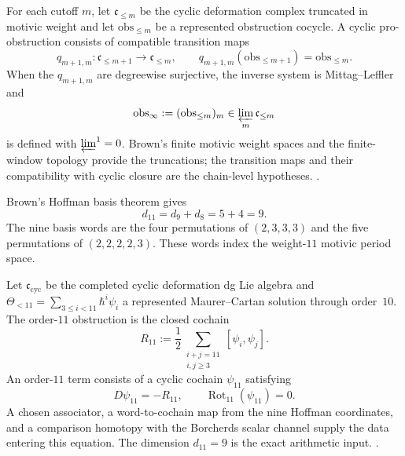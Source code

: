 \begin{remark}
\label{rem:nc-obs-infty}
For each cutoff \(m\), let \(\mathfrak c_{\leq m}\) be the cyclic
deformation complex truncated in motivic weight and let
\(\mathrm{obs}_{\leq m}\) be a represented obstruction cocycle.
A cyclic pro-obstruction consists of compatible transition maps
\[
 q_{m+1,m}\colon\mathfrak c_{\leq m+1}\longrightarrow
 \mathfrak c_{\leq m},
 \qquad
 q_{m+1,m}(\mathrm{obs}_{\leq m+1})
 =
 \mathrm{obs}_{\leq m}.
\]
When the \(q_{m+1,m}\) are degreewise surjective, the inverse system is
Mittag--Leffler and
\[
 \mathrm{obs}_\infty:=
 (\mathrm{obs}_{\leq m})_m
 \in\varprojlim_m\mathfrak c_{\leq m}
\]
is defined with \(\varprojlim^1=0\).  Brown's finite motivic
weight spaces and the finite-window topology provide the truncations;
the transition maps and their compatibility with cyclic closure are
the chain-level hypotheses.
\cite{Brown2011,MarklShniderStasheff2002}.
\end{remark}

\begin{remark}
\label{rem:nc-phi11}
Brown's Hoffman basis theorem gives
\[
 d_{11}=d_9+d_8=5+4=9.
\]
The nine basis words are the four permutations of
\((2,3,3,3)\) and the five permutations of
\((2,2,2,2,3)\).  These words index the weight-$11$ motivic period
space.

Let \(\mathfrak c_{\mathrm{cyc}}\) be the completed cyclic deformation
dg Lie algebra and
\(\Theta_{<11}=\sum_{3\leq i<11}\hbar^i\psi_i\) a represented
Maurer--Cartan solution through order~$10$.  The order-$11$
obstruction is the closed cochain
\[
 R_{11}:=
 \frac12\!\sum_{\substack{i+j=11\\i,j\geq3}}[\psi_i,\psi_j].
\]
An order-$11$ term consists of a cyclic cochain
\(\psi_{11}\) satisfying
\[
 D\psi_{11}=-R_{11},
 \qquad
 \operatorname{Rot}_{11}(\psi_{11})=0.
\]
A chosen associator, a word-to-cochain map from the nine Hoffman
coordinates, and a comparison homotopy with the Borcherds scalar
channel supply the data entering this equation.  The dimension
\(d_{11}=9\) is the exact arithmetic input.
\cite{Brown2011,Hoffman1997,Drinfeld1990}.
\end{remark}

